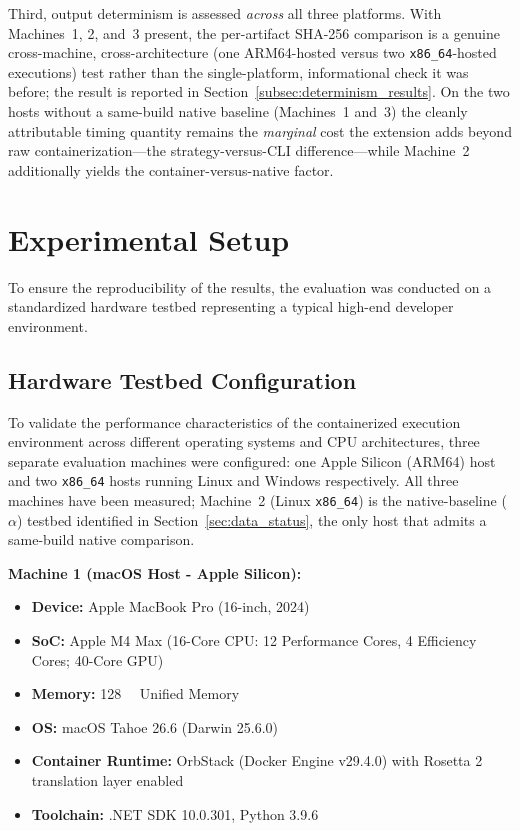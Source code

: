 Third, output determinism is assessed \emph{across} all three platforms. With Machines~1, 2, and~3 present, the per-artifact SHA-256 comparison is a genuine cross-machine, cross-architecture (one ARM64-hosted versus two \texttt{x86\_64}-hosted executions) test rather than the single-platform, informational check it was before; the result is reported in Section~\ref{subsec:determinism_results}. On the two hosts without a same-build native baseline (Machines~1 and~3) the cleanly attributable timing quantity remains the \emph{marginal} cost the extension adds beyond raw containerization---the strategy-versus-CLI difference---while Machine~2 additionally yields the container-versus-native factor.

\section{Experimental Setup}
To ensure the reproducibility of the results, the evaluation was conducted on a standardized hardware testbed representing a typical high-end developer environment.

\subsection{Hardware Testbed Configuration}
To validate the performance characteristics of the containerized execution environment across different operating systems and CPU architectures, three separate evaluation machines were configured: one Apple Silicon (ARM64) host and two \texttt{x86\_64} hosts running Linux and Windows respectively. All three machines have been measured; Machine~2 (Linux \texttt{x86\_64}) is the native-baseline ($\alpha$) testbed identified in Section~\ref{sec:data_status}, the only host that admits a same-build native comparison.

\textbf{Machine 1 (macOS Host - Apple Silicon):}
\begin{itemize}
    \item \textbf{Device:} Apple MacBook Pro (16-inch, 2024)
    \item \textbf{SoC:} Apple M4 Max (16-Core CPU: 12 Performance Cores, 4 Efficiency Cores; 40-Core GPU)
    \item \textbf{Memory:} \SI{128}{\giga\byte} Unified Memory
    \item \textbf{OS:} macOS Tahoe 26.6 (Darwin 25.6.0)
    \item \textbf{Container Runtime:} OrbStack (Docker Engine v29.4.0) with Rosetta 2 translation layer enabled
    \item \textbf{Toolchain:} .NET SDK 10.0.301, Python 3.9.6
\end{itemize}

